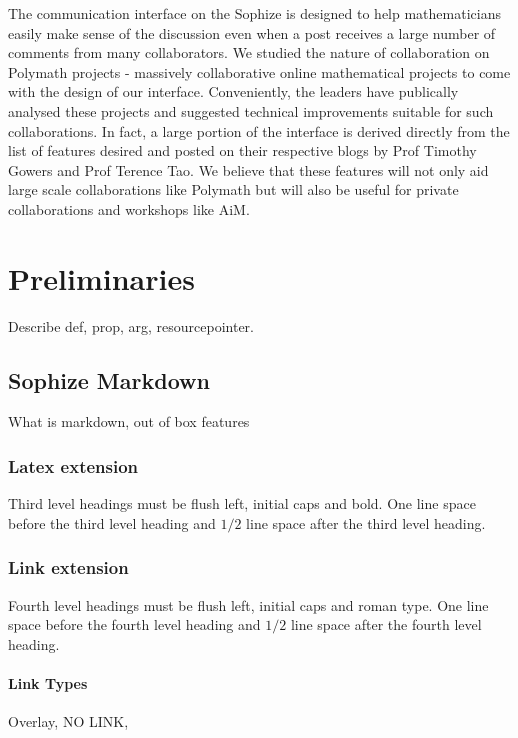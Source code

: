 \documentclass[a4paper]{article}
\begin{document}
The communication interface on the Sophize is designed to help mathematicians easily make sense of the discussion even when a post receives a large number of comments from many collaborators. We studied the nature of collaboration on Polymath projects - massively collaborative online mathematical projects to come with the design of our interface. Conveniently, the leaders have publically analysed these projects and suggested technical improvements suitable for such collaborations. In fact, a large portion of the interface is derived directly from the list of features desired and posted on their respective blogs by Prof Timothy Gowers and Prof Terence Tao. We believe that these features will not only aid large scale collaborations like Polymath but will also be useful for private collaborations and workshops like AiM.


\section{Preliminaries}

Describe def, prop, arg, resourcepointer.

\subsection{Sophize Markdown}

What is markdown, out of box features

\subsubsection{Latex extension}

Third level headings must be flush left, initial caps and bold.
One line space before the third level heading and $1/2$ line
space after the third level heading.

\subsubsection{Link extension}

Fourth level headings must be flush left, initial caps and roman type.
One line space before the fourth level heading and $1/2$ line
space after the fourth level heading.

\paragraph{Link Types}
Overlay, NO LINK, 
\end{document}
